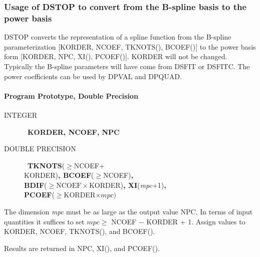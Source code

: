 \documentclass[twoside]{MATH77}
\begin{document}
\subsubsection{Usage of DSTOP to convert from the B-spline basis to the power
basis\label{dstop}}

DSTOP converts the representation of a spline function from the B-spline
parameterization [KORDER, NCOEF, TKNOTS(), BCOEF()] to the power
basis form [KORDER, NPC, XI(), PCOEF()]. KORDER will not be changed.
Typically the B-spline parameters will have come from DSFIT or DSFITC.
The power coefficients can be used by DPVAL and DPQUAD.

\paragraph{Program Prototype, Double Precision}
\begin{description}
\item[INTEGER]  \ {\bf KORDER, NCOEF, NPC}

\item[DOUBLE PRECISION]  \ {\bf TKNOTS}($\geq $NCOEF+\\ KORDER){\bf ,
BCOEF}($\geq $NCOEF){\bf ,\\ BDIF}($\geq \text{NCOEF}\times $KORDER){\bf ,
XI}({\em mpc}+1){\bf ,\\ PCOEF}($\geq $KORDER$\times mpc)$
\end{description}
The dimension {\em mpc} must be as large as the output value NPC. In terms of
input quantities it suffices to set $mpc \geq $ NCOEF $-$ KORDER + 1. Assign
values to KORDER, NCOEF, TKNOTS(), and BCOEF().\vspace{-10pt}
\begin{center}
\end{center}
Results are returned in NPC, XI(), and PCOEF().
\end{document}
